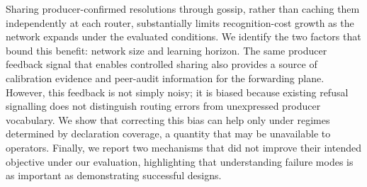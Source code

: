 \documentclass[conference]{IEEEtran}
\begin{document}
		Sharing producer-confirmed resolutions through gossip, rather than caching
		them independently at each router, substantially limits recognition-cost
		growth as the network expands under the evaluated conditions. We identify the
		two factors that bound this benefit: network size and learning horizon. The
		same producer feedback signal that enables controlled sharing also provides a
		source of calibration evidence and peer-audit information for the forwarding
		plane. However, this feedback is not simply noisy; it is biased because
		existing refusal signalling does not distinguish routing errors from
		unexpressed producer vocabulary. We show that correcting this bias can help
		only under regimes determined by declaration coverage, a quantity that may be
		unavailable to operators. Finally, we report two mechanisms that did not
		improve their intended objective under our evaluation, highlighting that
		understanding failure modes is as important as demonstrating successful
		designs.
		
		
		
		
	
\end{document}
